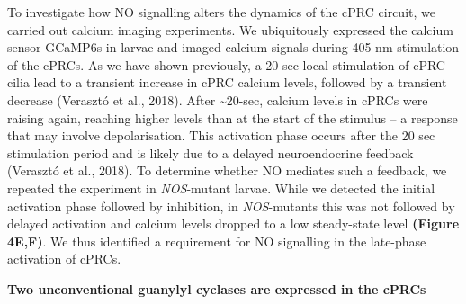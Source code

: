 \documentclass[
  10pt,
  onecolumn]{article}
\begin{document}
To investigate how NO signalling alters the dynamics of the cPRC
circuit, we carried out calcium imaging experiments. We ubiquitously
expressed the calcium sensor GCaMP6s in larvae and imaged calcium
signals during 405 nm stimulation of the cPRCs. As we have shown
previously, a 20-sec local stimulation of cPRC cilia lead to a transient
increase in cPRC calcium levels, followed by a transient decrease
(Verasztó et al., 2018). After \textasciitilde20-sec, calcium levels in
cPRCs were raising again, reaching higher levels than at the start of
the stimulus -- a response that may involve depolarisation. This
activation phase occurs after the 20 sec stimulation period and is
likely due to a delayed neuroendocrine feedback (Verasztó et al., 2018).
To determine whether NO mediates such a feedback, we repeated the
experiment in \emph{NOS}-mutant larvae. While we detected the initial
activation phase followed by inhibition, in \emph{NOS}-mutants this was
not followed by delayed activation and calcium levels dropped to a low
steady-state level \textbf{(Figure 4E,F)}. We thus identified a
requirement for NO signalling in the late-phase activation of cPRCs.

\textbf{Two unconventional guanylyl cyclases are expressed in the cPRCs}
\end{document}
